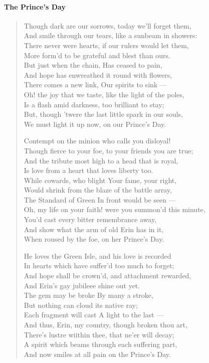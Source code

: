 \paragraph{The Prince's Day}

\begin{verse}
Though dark are our sorrows, today we'll forget them,\\
And smile through our tears, like a sunbeam in showers:\\
There never were hearts, if our rulers would let them,\\
More form'd to be grateful and blest than ours.\\
But just when the chain, Has ceased to pain,\\
And hope has enwreathed it round with flowers,\\
There comes a new link, Our spirits to sink ---\\
Oh! the joy that we taste, like the light of the poles,\\
Is a flash amid darkness, too brilliant to stay;\\
But, though 'twere the last little spark in our souls,\\
We must light it up now, on our Prince's Day.

Contempt on the minion who calls you disloyal!\\
Though fierce to your foe, to your friends you are true;\\
And the tribute most high to a head that is royal,\\
Is love from a heart that loves liberty too.\\
While cowards, who blight Your fame, your right,\\
Would shrink from the blaze of the battle array,\\
The Standard of Green In front would be seen ---\\
Oh, my life on your faith! were you summon'd this minute,\\
You'd cast every bitter remembrance away,\\
And show what the arm of old Erin has in it,\\
When roused by the foe, on her Prince's Day.

He loves the Green Isle, and his love is recorded\\
In hearts which have suffer'd too much to forget;\\
And hope shall be crown'd, and attachment rewarded,\\
And Erin's gay jubileee shine out yet.\\
The gem may be broke By many a stroke,\\
But nothing can cloud its native ray;\\
Each fragment will cast A light to the last ---\\
And thus, Erin, my country, though broken thou art,\\
There's lustre wiithin thee, that ne'er will decay;\\
A spirit which beams through each suffering part,\\
And now smiles at all pain on the Prince's Day.
\end{verse}



